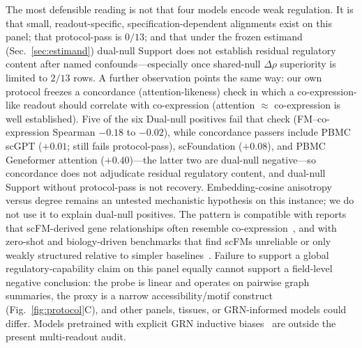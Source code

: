 \documentclass[fleqn,10pt,lineno]{wlpeerj}
\begin{document}
The most defensible reading is not that four models encode weak regulation. It is that small,
readout-specific, specification-dependent alignments exist on this panel; that protocol-pass is
$0/13$; and that under the frozen estimand (Sec.~\ref{sec:estimand}) dual-null Support does not
establish residual regulatory content after named confounds---especially once shared-null
$\Delta\rho$ superiority is limited to $2/13$ rows. A further observation points the same way: our own protocol
freezes a concordance (attention-likeness) check in which a co-expression-like readout
should correlate with co-expression (attention $\approx$ co-expression is well established). Five of
the six Dual-null positives fail that check (FM--co-expression Spearman $-0.18$ to $-0.02$), while
concordance passers include PBMC scGPT ($+0.01$; still fails protocol-pass), scFoundation ($+0.08$),
and PBMC Geneformer attention ($+0.40$)---the latter two are dual-null negative---so concordance does
not adjudicate residual regulatory content, and dual-null Support without protocol-pass is not
recovery. Embedding-cosine anisotropy versus degree remains an
untested mechanistic hypothesis on this instance; we do not
use it to explain dual-null positives. The pattern is compatible with reports that scFM-derived gene
relationships often resemble
co-expression~\citep{kendiukhov2026scfm,kendiukhov2026sae}, and with zero-shot and biology-driven
benchmarks that find scFMs unreliable or only weakly structured relative to simpler
baselines~\citep{kedzierska2023assessing,wu2025biologydriven,qiu2025biollm}. Failure to support a
global regulatory-capability claim on this panel equally cannot support a field-level negative
conclusion: the probe is linear and operates on pairwise graph summaries, the proxy is a narrow
accessibility/motif construct (Fig.~\ref{fig:protocol}C), and other panels, tissues, or GRN-informed
models could differ.
Models pretrained with explicit GRN inductive biases~\citep{yang2024genecompass,kalfon2025scprint,hu2026regformer}
are outside the present multi-readout audit.
\end{document}
